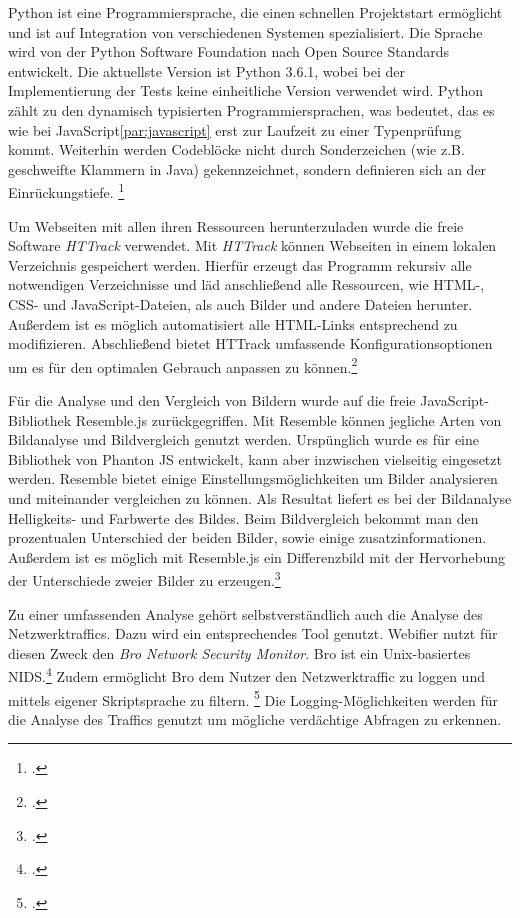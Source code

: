Python ist eine Programmiersprache, die einen schnellen Projektstart ermöglicht und ist auf Integration von verschiedenen Systemen spezialisiert.
Die Sprache wird von der Python Software Foundation nach Open Source Standards entwickelt.
Die aktuellste Version ist Python 3.6.1, wobei bei der Implementierung der Tests keine einheitliche Version verwendet wird.
Python zählt zu den dynamisch typisierten Programmiersprachen, was bedeutet, das es wie bei JavaScript\ref{par:javascript} erst zur Laufzeit zu einer Typenprüfung kommt.
Weiterhin werden Codeblöcke nicht durch Sonderzeichen (wie z.B. geschweifte Klammern in Java) gekennzeichnet, sondern definieren sich an der Einrückungstiefe.
\footcite{pythonHomepage}


Um Webseiten mit allen ihren Ressourcen herunterzuladen wurde die freie Software \textit{HTTrack} verwendet. Mit \textit{HTTrack} können Webseiten in einem lokalen Verzeichnis gespeichert werden. Hierfür erzeugt das Programm rekursiv alle notwendigen Verzeichnisse und läd anschließend alle Ressourcen, wie \ac{HTML}-, \ac{CSS}- und JavaScript-Dateien, als auch Bilder und andere Dateien herunter. Außerdem ist es möglich automatisiert alle \ac{HTML}-Links entsprechend zu modifizieren. Abschließend bietet HTTrack umfassende Konfigurationsoptionen um es für den optimalen Gebrauch anpassen zu können.\footcite[Vgl.][]{httrack}

Für die Analyse und den Vergleich von Bildern wurde auf die freie JavaScript-Bibliothek Resemble.js zurückgegriffen. Mit Resemble können jegliche Arten von Bildanalyse und Bildvergleich genutzt werden. Urspünglich wurde es für eine Bibliothek von Phanton JS entwickelt, kann aber inzwischen vielseitig eingesetzt werden. Resemble bietet einige Einstellungsmöglichkeiten um Bilder analysieren und miteinander vergleichen zu können. Als Resultat liefert es bei der Bildanalyse Helligkeits- und Farbwerte des Bildes. Beim Bildvergleich bekommt man den prozentualen Unterschied der beiden Bilder, sowie einige zusatzinformationen. Außerdem ist es möglich mit Resemble.js ein Differenzbild mit der Hervorhebung der Unterschiede zweier Bilder zu erzeugen.\footcite[Vgl.][]{resemblejs}

Zu einer umfassenden Analyse gehört selbstverständlich auch die Analyse des Netzwerktraffics. Dazu wird ein entsprechendes Tool genutzt. Webifier nutzt für diesen Zweck den \textit{Bro Network Security Monitor}. Bro ist ein Unix-basiertes \ac{NIDS}.\footcite[Vgl.][199]{bro} Zudem ermöglicht Bro dem Nutzer den Netzwerktraffic zu loggen und mittels eigener Skriptsprache zu filtern. \footcite{bro2} Die Logging-Möglichkeiten werden für die Analyse des Traffics genutzt um mögliche verdächtige Abfragen zu erkennen.


